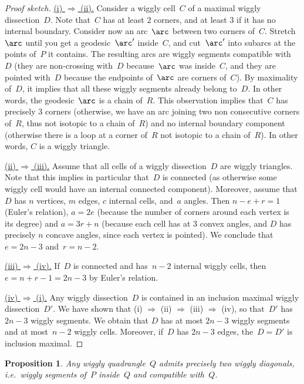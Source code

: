 \documentclass{amsart}
\newtheorem{proposition}[theorem]{Proposition}
\theoremstyle{definition}
\newcommand{\ie}{\textit{i.e.}~} %
\newcommand{\para}[1]{\smallskip\noindent\uline{#1.}} %
\begin{document}
\begin{proof}[Proof sketch]
\para{(i) $\Rightarrow$ (ii)}
Consider a wiggly cell~$C$ of a maximal wiggly dissection~$D$.
Note that~$C$ has at least $2$ corners, and at least $3$ if it has no internal boundary.
Consider now an arc~$\arc$ between two corners of~$C$.
Stretch~$\arc$ until you get a geodesic~$\arc'$ inside~$C$, and cut~$\arc'$ into subarcs at the points of~$P$ it contains.
The resulting arcs are wiggly segments compatible with~$D$ (they are non-crossing with~$D$ because~$\arc$ was inside~$C$, and they are pointed with~$D$ because the endpoints of~$\arc$ are corners of~$C$).
By maximality of~$D$, it implies that all these wiggly segments already belong to~$D$.
In other words, the geodesic~$\arc$ is a chain of~$R$.
This observation implies that~$C$ has precisely $3$ corners (otherwise, we have an arc joining two non consecutive corners of~$R$, thus not isotopic to a chain of~$R$) and no internal boundary component (otherwise there is a loop at a corner of~$R$ not isotopic to a chain of~$R$).
In other words, $C$ is a wiggly triangle.

\para{(ii) $\Rightarrow$ (iii)}
Assume that all cells of a wiggly dissection~$D$ are wiggly triangles.
Note that this implies in particular that~$D$ is connected (as otherwise some wiggly cell would have an internal connected component).
Moreover, assume that $D$ has $n$ vertices, $m$ edges, $c$ internal cells, and~$a$ angles.
Then $n-e+r=1$ (Euler's relation), $a = 2e$ (because the number of corners around each vertex is its degree) and $a = 3r + n$ (because each cell has at $3$ convex angles, and $D$ has precisely $n$ concave angles, since each vertex is pointed).
We conclude that~$e = 2n-3$ and~$r = n-2$.

\para{(iii) $\Rightarrow$ (iv)}
If~$D$ is connected and has~$n-2$ internal wiggly cells, then~$e = n + r - 1 = 2n - 3$ by Euler's relation.

\para{(iv) $\Rightarrow$ (i)}
Any wiggly dissection~$D$ is contained in an inclusion maximal wiggly dissection~$D'$.
We have shown that (i) $\Rightarrow$ (ii) $\Rightarrow$ (iii) $\Rightarrow$ (iv), so that~$D'$ has~$2n-3$ wiggly segments.
We obtain that $D$ has at most $2n-3$ wiggly segments and at most~$n-2$ wiggly cells.
Moreover, if~$D$ has $2n-3$ edges, the~$D = D'$ is inclusion maximal.
\end{proof}

\begin{proposition}
\label{prop:diagonals}
Any wiggly quadrangle~$Q$ admits precisely two wiggly diagonals, \ie wiggly segments of~$P$ inside~$Q$ and compatible with~$Q$.
\end{proposition}
\end{document}
